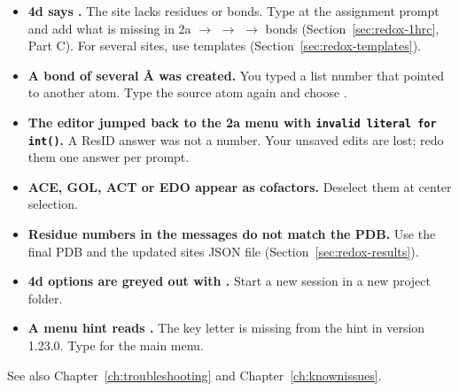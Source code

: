 \begin{itemize}\sloppy
  \item \textbf{4d says .} The site lacks
    residues or bonds. Type  at the assignment prompt and add
    what is missing in 2a $\to$  $\to$  $\to$ bonds
    (Section~\ref{sec:redox-1hrc}, Part C). For several sites, use templates
    (Section~\ref{sec:redox-templates}).
  \item \textbf{A bond of several \AA{} was created.} You typed a list number that
    pointed to another atom. Type the source atom again and choose
    .
  \item \textbf{The editor jumped back to the 2a menu with \texttt{invalid literal for
    int()}.} A ResID answer was not a number. Your unsaved edits are lost;
    redo them one answer per prompt.
  \item \textbf{ACE, GOL, ACT or EDO appear as cofactors.} Deselect them at center
    selection.
  \item \textbf{Residue numbers in the messages do not match the PDB.} Use the final
    PDB and the updated sites JSON file
    (Section~\ref{sec:redox-results}).
  \item \textbf{4d options are greyed out with .} Start a new session in a new project folder.
  \item \textbf{A menu hint reads .} The
    key letter is missing from the hint in version 1.23.0. Type  for
    the main menu.
\end{itemize}

See also Chapter~\ref{ch:troubleshooting} and Chapter~\ref{ch:knownissues}.
